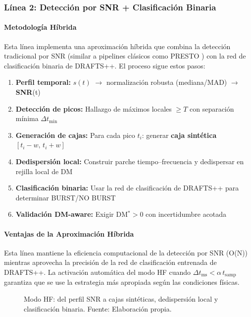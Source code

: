 \subsubsection{Línea 2: Detección por SNR + Clasificación Binaria}

\paragraph{Metodología Híbrida}

Esta línea implementa una aproximación híbrida que combina la detección tradicional por SNR (similar a pipelines clásicos como PRESTO \cite{ransom_presto}) con la red de clasificación binaria de DRAFTS++. El proceso sigue estos pasos:

\begin{enumerate}
\item \textbf{Perfil temporal:} $s(t)$ $\rightarrow$ normalización robusta (mediana/MAD) $\rightarrow$ \textbf{SNR}(t)
\item \textbf{Detección de picos:} Hallazgo de máximos locales $\ge T$ con separación mínima $\Delta t_{\min}$
\item \textbf{Generación de cajas:} Para cada pico $t_i$: generar \textbf{caja sintética} $[t_i-w,\, t_i+w]$
\item \textbf{Dedispersión local:} Construir parche tiempo--frecuencia y dedispersar en rejilla local de DM
\item \textbf{Clasificación binaria:} Usar la red de clasificación de DRAFTS++ para determinar BURST/NO BURST
\item \textbf{Validación DM-aware:} Exigir DM$^\ast\!>\!0$ con incertidumbre acotada
\end{enumerate}

\paragraph{Ventajas de la Aproximación Híbrida}

Esta línea mantiene la eficiencia computacional de la detección por SNR (O(N)) mientras aprovecha la precisión de la red de clasificación entrenada de DRAFTS++. La activación automática del modo HF cuando $\Delta t_{\mathrm{ms}} < \alpha\, t_{\mathrm{samp}}$ garantiza que se use la estrategia más apropiada según las condiciones físicas.

\begin{figure}[H] 
\centering 
\caption{Modo HF: del perfil SNR a cajas sintéticas, dedispersión local y clasificación binaria. Fuente: Elaboración propia.}
\label{fig:hf} 
\end{figure}

